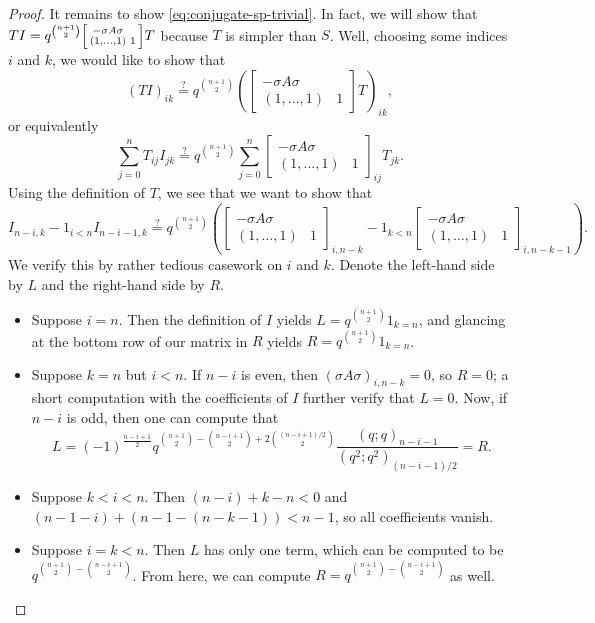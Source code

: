 \begin{proof}
    It remains to show \eqref{eq:conjugate-sp-trivial}. In fact, we will show that $TI=q^{\binom{n+1}2}\begin{bsmallmatrix}
        -\sigma A\sigma \\ (1,\ldots,1) & 1
    \end{bsmallmatrix}T$ because $T$ is simpler than $S$. Well, choosing some indices $i$ and $k$, we would like to show that
    \[(TI)_{ik}\stackrel?=q^{\binom{n+1}2}\left(\begin{bmatrix}
        -\sigma A\sigma \\ (1,\ldots,1) & 1
    \end{bmatrix}T\right)_{ik},\]
    or equivalently
    \[\sum_{j=0}^nT_{ij}I_{jk}\stackrel?=q^{\binom{n+1}2}\sum_{j=0}^n\begin{bmatrix}
        -\sigma A\sigma \\ (1,\ldots,1) & 1
    \end{bmatrix}_{ij}T_{jk}.\]
    Using the definition of $T$, we see that we want to show that
    \[I_{n-i,k}-1_{i<n}I_{n-i-1,k}\stackrel?=q^{\binom{n+1}2}\left(\begin{bmatrix}
        -\sigma A\sigma \\ (1,\ldots,1) & 1
    \end{bmatrix}_{i,n-k}-1_{k<n}\begin{bmatrix}
        -\sigma A\sigma \\ (1,\ldots,1) & 1
    \end{bmatrix}_{i,n-k-1}\right).\]
    We verify this by rather tedious casework on $i$ and $k$. Denote the left-hand side by $L$ and the right-hand side by $R$.
    \begin{itemize}
        \item Suppose $i=n$. Then the definition of $I$ yields $L=q^{\binom{n+1}2}1_{k=n}$, and glancing at the bottom row of our matrix in $R$ yields $R=q^{\binom{n+1}2}1_{k=n}$.
        \item Suppose $k=n$ but $i<n$. If $n-i$ is even, then $(\sigma A\sigma)_{i,n-k}=0$, so $R=0$; a short computation with the coefficients of $I$ further verify that $L=0$. Now, if $n-i$ is odd, then one can compute that
        \[L=(-1)^{\frac{n-i+1}2}q^{\binom{n+1}2-\binom{n-i+1}2+2\binom{(n-i+1)/2}2}\frac{(q;q)_{n-i-1}}{(q^2;q^2)_{(n-i-1)/2}}=R.\]
        \item Suppose $k<i<n$. Then $(n-i)+k-n<0$ and $(n-1-i)+(n-1-(n-k-1))<n-1$, so all coefficients vanish.
        \item Suppose $i=k<n$. Then $L$ has only one term, which can be computed to be $q^{\binom{n+1}2-\binom{n-i+1}2}$. From here, we can compute $R=q^{\binom{n+1}2-\binom{n-i+1}2}$ as well.

\end{itemize}
\end{proof}
